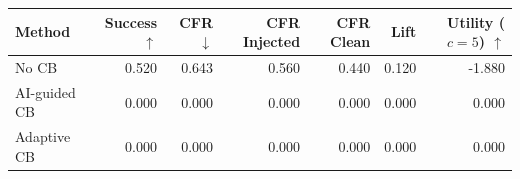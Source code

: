 \begin{tabular}{lrrrrrr}
\toprule
Method & Success $\uparrow$ & CFR $\downarrow$ & CFR Injected & CFR Clean & Lift & Utility ($c=5$) $\uparrow$ \\
\midrule
No CB & 0.520 & 0.643 & 0.560 & 0.440 & 0.120 & -1.880 \\
AI-guided CB & 0.000 & 0.000 & 0.000 & 0.000 & 0.000 & 0.000 \\
Adaptive CB & 0.000 & 0.000 & 0.000 & 0.000 & 0.000 & 0.000 \\
\bottomrule
\end{tabular}
